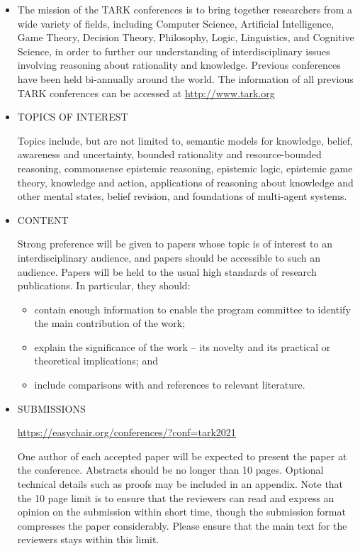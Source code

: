 \documentclass{article}
\begin{document}
\begin{itemize}\item  The mission of the TARK conferences is to bring together researchers from a wide variety of fields, including Computer Science, Artificial Intelligence, Game Theory, Decision Theory, Philosophy, Logic, Linguistics, and Cognitive Science, in order to further our understanding of interdisciplinary issues involving reasoning about rationality and knowledge. Previous conferences have been held bi-annually around the world. The information of all previous TARK conferences can be accessed at \href{http://www.tark.org}{http://www.tark.org} 
 
\item  TOPICS OF INTEREST 
 
  Topics include, but are not limited to, semantic models for knowledge, belief, awareness and uncertainty, bounded rationality and resource-bounded reasoning, commonsense epistemic reasoning, epistemic logic, epistemic game theory, knowledge and action, applications of reasoning about knowledge and other mental states, belief revision, and foundations of multi-agent systems. 
 
\item  CONTENT 
 
  Strong preference will be given to papers whose topic is of interest to an interdisciplinary audience, and papers should be accessible to such an audience. Papers will be held to the usual high standards of research publications. In particular, they should: 
 
\begin{itemize}\item  contain enough information to enable the program committee to identify the main contribution of the work;
\item  explain the significance of the work -- its novelty and its practical or theoretical implications; and
\item  include comparisons with and references to relevant literature.
\end{itemize} 
\item  SUBMISSIONS 
 
  \href{https://easychair.org/conferences/?conf=tark2021}{https://easychair.org/conferences/?conf=tark2021} 
 
  One author of each accepted paper will be expected to present the paper at the conference. Abstracts should be no longer than 10 pages. Optional technical details such as proofs may be included in an appendix.  Note that the 10 page limit is to ensure that the reviewers can read and express an opinion on the submission within short time, though the submission format compresses the paper considerably. Please ensure that the main text for the reviewers stays within this limit. 
 

\end{itemize}
\end{document}
